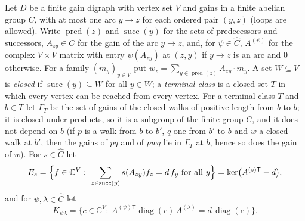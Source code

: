 Let $D$ be a finite gain digraph with vertex set $V$ and gains in a finite abelian group $C$, with at most one arc $y\to z$ for each ordered pair $(y,z)$ (loops are allowed). Write $\operatorname{pred}(z)$ and $\operatorname{succ}(y)$ for the sets of predecessors and successors, $A_{zy}\in C$ for the gain of the arc $y\to z$, and, for $\psi\in\hat C$, $A^{(\psi)}$ for the complex $V\times V$ matrix with entry $\psi(A_{zy})$ at $(z,y)$ if $y\to z$ is an arc and $0$ otherwise. For a family $(m_y)_{y\in V}$ put $w_z=\sum_{y\in\operatorname{pred}(z)}A_{zy}\cdot m_y$. A set $W\subseteq V$ is \emph{closed} if $\operatorname{succ}(y)\subseteq W$ for all $y\in W$; a \emph{terminal class} is a closed set $T$ in which every vertex can be reached from every vertex. For a terminal class $T$ and $b\in T$ let $\Gamma_T$ be the set of gains of the closed walks of positive length from $b$ to $b$; it is closed under products, so it is a subgroup of the finite group $C$, and it does not depend on $b$ (if $p$ is a walk from $b$ to $b'$, $q$ one from $b'$ to $b$ and $w$ a closed walk at $b'$, then the gains of $pq$ and of $pwq$ lie in $\Gamma_T$ at $b$, hence so does the gain of $w$). For $s\in\hat C$ let
\[
E_s=\Bigl\{f\in\mathbb{C}^V:\ \sum_{z\in\operatorname{succ}(y)}s(A_{zy})f_z=d\,f_y\ \text{for all }y\Bigr\}=\ker\bigl(A^{(s)\mathsf T}-d\bigr),
\]
and for $\psi,\lambda\in\hat C$ let
\[
K_{\psi\lambda}=\bigl\{c\in\mathbb{C}^V:\ A^{(\psi)\mathsf T}\operatorname{diag}(c)\,A^{(\lambda)}=d\,\operatorname{diag}(c)\bigr\}.
\]

